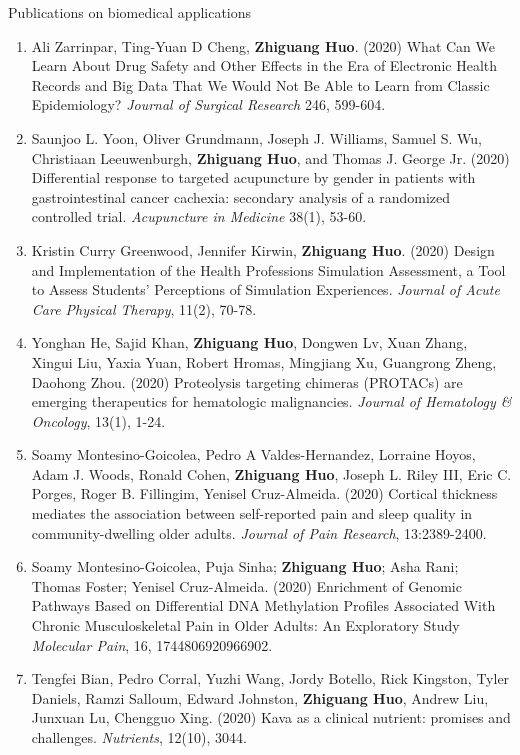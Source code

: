 \documentclass{resume} %
\begin{document}
\begin{rSection}{Publications on biomedical applications}
\begin{enumerate}[noitemsep,topsep=0pt, resume]
\item
Ali Zarrinpar,  Ting-Yuan D Cheng, {\bf Zhiguang Huo}. (2020)
What Can We Learn About Drug Safety and Other Effects in the Era of Electronic Health Records and Big Data That We Would Not Be Able to Learn from Classic Epidemiology?
\emph{Journal of Surgical Research} 246, 599-604.

\item 
Saunjoo L. Yoon, Oliver Grundmann, Joseph J. Williams, Samuel S. Wu, Christiaan Leeuwenburgh, {\bf Zhiguang Huo}, and Thomas J. George Jr. (2020)
Differential response to targeted acupuncture by gender in patients with gastrointestinal cancer cachexia: secondary analysis of a randomized controlled trial.
\emph{Acupuncture in Medicine}  38(1), 53-60.

\item
Kristin Curry Greenwood,  Jennifer Kirwin, {\bf Zhiguang Huo}. (2020)
Design and Implementation of the Health Professions Simulation Assessment, a Tool to Assess Students' Perceptions of Simulation Experiences. 
\emph{Journal of Acute Care Physical Therapy}, 11(2), 70-78.


 
\item
Yonghan He, Sajid Khan, {\bf Zhiguang Huo}, Dongwen Lv, Xuan Zhang, Xingui Liu, Yaxia Yuan, Robert Hromas, Mingjiang Xu, Guangrong Zheng, Daohong Zhou. (2020)
Proteolysis targeting chimeras (PROTACs) are emerging therapeutics for hematologic malignancies.
\emph{Journal of Hematology \& Oncology}, 13(1), 1-24.

\item  
Soamy Montesino-Goicolea, Pedro A Valdes-Hernandez,  Lorraine Hoyos, Adam J. Woods, Ronald Cohen,  {\bf Zhiguang Huo}, Joseph L. Riley III, Eric C. Porges, Roger B. Fillingim, Yenisel Cruz-Almeida. (2020)
Cortical thickness mediates the association between self-reported pain and sleep quality in community-dwelling older adults. 
\emph{Journal of Pain Research}, 13:2389-2400.


\item
Soamy Montesino-Goicolea, Puja Sinha; {\bf Zhiguang Huo}; Asha Rani; Thomas Foster; Yenisel Cruz-Almeida. (2020)
Enrichment of Genomic Pathways Based on Differential DNA Methylation Profiles Associated With Chronic Musculoskeletal Pain in Older Adults: An Exploratory Study
\emph{Molecular Pain}, 16, 1744806920966902.

\item  
Tengfei Bian, Pedro Corral, Yuzhi Wang, Jordy Botello, Rick Kingston, Tyler Daniels, Ramzi Salloum, Edward Johnston, {\bf Zhiguang Huo}, Andrew Liu,  Junxuan Lu, Chengguo Xing. (2020)
Kava as a clinical nutrient: promises and challenges.
\emph{Nutrients}, 12(10), 3044.





\end{enumerate}
\end{rSection}
\end{document}
